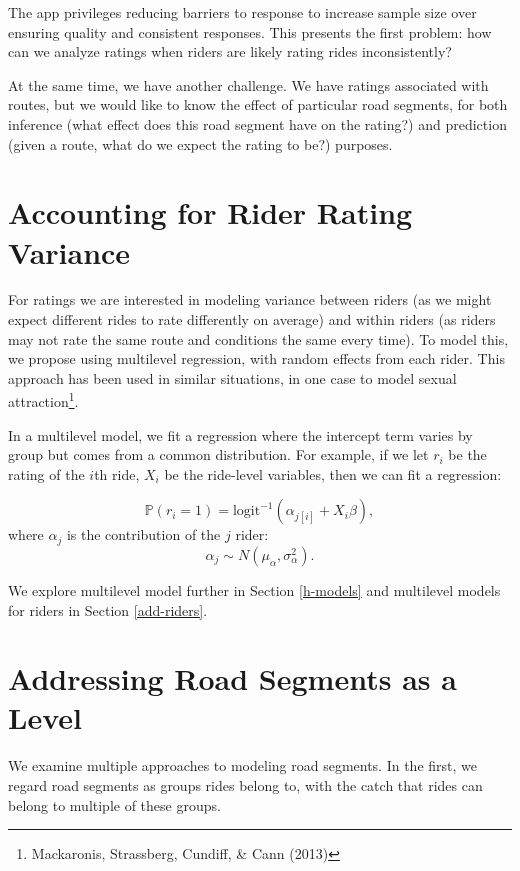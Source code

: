 \documentclass[12pt,twoside]{reedthesis}
\begin{document}
  The app privileges reducing barriers to response to increase sample size
  over ensuring quality and consistent responses. This presents the first
  problem: how can we analyze ratings when riders are likely rating rides
  inconsistently?
  
  At the same time, we have another challenge. We have ratings associated
  with routes, but we would like to know the effect of particular road
  segments, for both inference (what effect does this road segment have on
  the rating?) and prediction (given a route, what do we expect the rating
  to be?) purposes.
  
  \section{Accounting for Rider Rating
  Variance}\label{accounting-for-rider-rating-variance}
  
  For ratings we are interested in modeling variance between riders (as we
  might expect different rides to rate differently on average) and within
  riders (as riders may not rate the same route and conditions the same
  every time). To model this, we propose using multilevel regression, with
  random effects from each rider. This approach has been used in similar
  situations, in one case to model sexual attraction\footnote{Mackaronis,
    Strassberg, Cundiff, \& Cann (2013)}.
  
  In a multilevel model, we fit a regression where the intercept term
  varies by group but comes from a common distribution. For example, if we
  let \(r_i\) be the rating of the \(i\)th ride, \(X_i\) be the ride-level
  variables, then we can fit a regression:
  
  \[\mathbb{P}(r_i = 1) = \text{logit}^{-1}
  \left( \alpha_{j[i]} +  X_i \beta \right) ,\] where \(\alpha_j\) is the
  contribution of the \(j\) rider:
  \[\alpha_j \sim N (\mu_\alpha, \sigma^2_\alpha).\]
  
  We explore multilevel model further in Section \autoref{h-models} and
  multilevel models for riders in Section \autoref{add-riders}.
  
  \section{Addressing Road Segments as a
  Level}\label{addressing-road-segments-as-a-level}
  
  We examine multiple approaches to modeling road segments. In the first,
  we regard road segments as groups rides belong to, with the catch that
  rides can belong to multiple of these groups.
  
\end{document}
